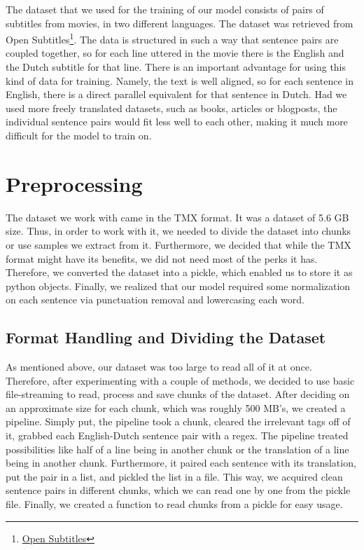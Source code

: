 \documentclass[11pt]{article}
\begin{document}
The dataset that we used for the training of our model consists of pairs of subtitles from movies, in two different languages. The dataset was retrieved from Open Subtitles\footnote[2]{\href{http://opus.nlpl.eu/OpenSubtitles-v2018.php}{Open Subtitles}}. The data is structured in such a way that sentence pairs are coupled together, so for each line uttered in the movie there is the English and the Dutch subtitle for that line. There is an important advantage for using this kind of data for training. Namely, the text is well aligned, so for each sentence in English, there is a direct parallel equivalent for that sentence in Dutch. Had we used more freely translated datasets, such as books, articles or blogposts, the individual sentence pairs would fit less well to each other, making it much more difficult for the model to train on.

\section{Preprocessing}
The dataset we work with came in the TMX format. It was a dataset of 5.6 GB size. Thus, in order to work with it, we needed to divide the dataset into chunks or use samples we extract from it. Furthermore, we decided that while the TMX format might have its benefits, we did not need most of the perks it has. Therefore, we converted the dataset into a pickle, which enabled us to store it as python objects. Finally, we realized that our model required some normalization on each sentence via punctuation removal and lowercasing each word.

\subsection{Format Handling and Dividing the Dataset}
As mentioned above, our dataset was too large to read all of it at once. Therefore, after experimenting with a couple of methods, we decided to use basic file-streaming to read, process and save chunks of the dataset. After deciding on an approximate size for each chunk, which was roughly 500 MB's, we created a pipeline. Simply put, the pipeline took a chunk, cleared the irrelevant tags off of it, grabbed each English-Dutch sentence pair with a regex. The pipeline treated possibilities like half of a line being in another chunk or the translation of a line being in another chunk. Furthermore, it paired each sentence with its translation, put the pair in a list, and pickled the list in a file. This way, we acquired clean sentence pairs in different chunks, which we can read one by one from the pickle file. Finally, we created a function to read chunks from a pickle for easy usage.
\end{document}
